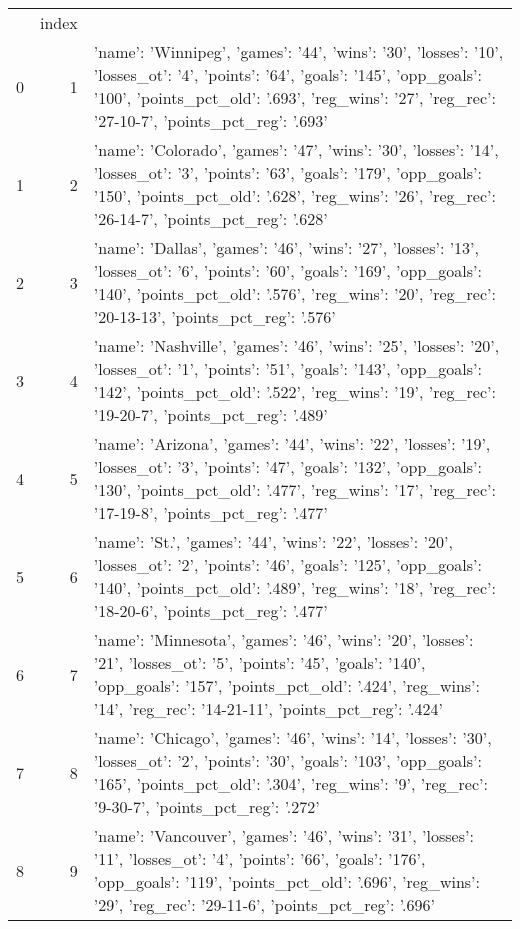 \begin{tabular}{lrl}
 & index &  \\
0 & 1 & {'name': 'Winnipeg', 'games': '44', 'wins': '30', 'losses': '10', 'losses_ot': '4', 'points': '64', 'goals': '145', 'opp_goals': '100', 'points_pct_old': '.693', 'reg_wins': '27', 'reg_rec': '27-10-7', 'points_pct_reg': '.693'} \\
1 & 2 & {'name': 'Colorado', 'games': '47', 'wins': '30', 'losses': '14', 'losses_ot': '3', 'points': '63', 'goals': '179', 'opp_goals': '150', 'points_pct_old': '.628', 'reg_wins': '26', 'reg_rec': '26-14-7', 'points_pct_reg': '.628'} \\
2 & 3 & {'name': 'Dallas', 'games': '46', 'wins': '27', 'losses': '13', 'losses_ot': '6', 'points': '60', 'goals': '169', 'opp_goals': '140', 'points_pct_old': '.576', 'reg_wins': '20', 'reg_rec': '20-13-13', 'points_pct_reg': '.576'} \\
3 & 4 & {'name': 'Nashville', 'games': '46', 'wins': '25', 'losses': '20', 'losses_ot': '1', 'points': '51', 'goals': '143', 'opp_goals': '142', 'points_pct_old': '.522', 'reg_wins': '19', 'reg_rec': '19-20-7', 'points_pct_reg': '.489'} \\
4 & 5 & {'name': 'Arizona', 'games': '44', 'wins': '22', 'losses': '19', 'losses_ot': '3', 'points': '47', 'goals': '132', 'opp_goals': '130', 'points_pct_old': '.477', 'reg_wins': '17', 'reg_rec': '17-19-8', 'points_pct_reg': '.477'} \\
5 & 6 & {'name': 'St.', 'games': '44', 'wins': '22', 'losses': '20', 'losses_ot': '2', 'points': '46', 'goals': '125', 'opp_goals': '140', 'points_pct_old': '.489', 'reg_wins': '18', 'reg_rec': '18-20-6', 'points_pct_reg': '.477'} \\
6 & 7 & {'name': 'Minnesota', 'games': '46', 'wins': '20', 'losses': '21', 'losses_ot': '5', 'points': '45', 'goals': '140', 'opp_goals': '157', 'points_pct_old': '.424', 'reg_wins': '14', 'reg_rec': '14-21-11', 'points_pct_reg': '.424'} \\
7 & 8 & {'name': 'Chicago', 'games': '46', 'wins': '14', 'losses': '30', 'losses_ot': '2', 'points': '30', 'goals': '103', 'opp_goals': '165', 'points_pct_old': '.304', 'reg_wins': '9', 'reg_rec': '9-30-7', 'points_pct_reg': '.272'} \\
8 & 9 & {'name': 'Vancouver', 'games': '46', 'wins': '31', 'losses': '11', 'losses_ot': '4', 'points': '66', 'goals': '176', 'opp_goals': '119', 'points_pct_old': '.696', 'reg_wins': '29', 'reg_rec': '29-11-6', 'points_pct_reg': '.696'} \\

\end{tabular}
